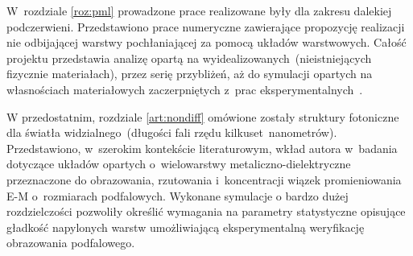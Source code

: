 W~rozdziale \ref{roz:pml} prowadzone prace realizowane były dla zakresu dalekiej podczerwieni. Przedstawiono prace numeryczne zawierające propozycję realizacji nie odbijającej warstwy pochłaniającej za pomocą układów warstwowych. Całość projektu przedstawia analizę opartą na wyidealizowanych~(nieistniejących fizycznie materiałach), przez serię przybliżeń, aż do symulacji opartych na własnościach materiałowych zaczerpniętych z~prac eksperymentalnych~\cite{ania2015,stefaniuk2015perfectly}.

W przedostatnim,  rozdziale \ref{art:nondiff}  omówione zostały struktury fotoniczne dla światła widzialnego~(długości fali rzędu kilkuset~nanometrów). Przedstawiono, w~szerokim kontekście literaturowym, wkład autora w~badania dotyczące układów opartych o~wielowarstwy metaliczno-dielektryczne przeznaczone do obrazowania, rzutowania i~koncentracji wiązek promieniowania E-M o~rozmiarach podfalowych. Wykonane symulacje o bardzo dużej rozdzielczości pozwoliły określić wymagania na parametry statystyczne opisujące gładkość napylonych warstw umożliwiającą eksperymentalną weryfikację obrazowania podfalowego.

